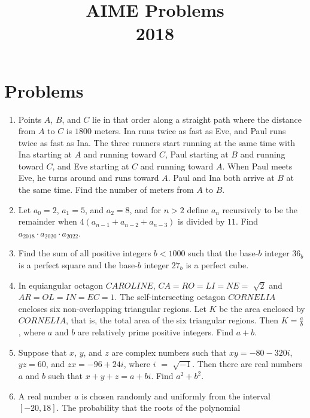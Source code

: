 \documentclass{article}
\title{AIME Problems \\ 2018}
\date{}
\begin{document}
\maketitle\thispagestyle{fancy}\newpage\section*{Problems}\begin{enumerate}[label=\arabic*., itemsep=0.5em]\item Points $A$, $B$, and $C$ lie in that order along a straight path where the distance from $A$ to $C$ is $1800$ meters. Ina runs twice as fast as Eve, and Paul runs twice as fast as Ina. The three runners start running at the same time with Ina starting at $A$ and running toward $C$, Paul starting at $B$ and running toward $C$, and Eve starting at $C$ and running toward $A$. When Paul meets Eve, he turns around and runs toward $A$. Paul and Ina both arrive at $B$ at the same time. Find the number of meters from $A$ to $B$.\par \vspace{0.5em}\item Let $a_{0} = 2$, $a_{1} = 5$, and $a_{2} = 8$, and for $n > 2$ define $a_{n}$ recursively to be the remainder when $4(a_{n-1} + a_{n-2} + a_{n-3})$ is divided by $11$. Find $a_{2018} \cdot a_{2020} \cdot a_{2022}$.\par \vspace{0.5em}\item Find the sum of all positive integers $b < 1000$ such that the base-$b$ integer $36_{b}$ is a perfect square and the base-$b$ integer $27_{b}$ is a perfect cube.\par \vspace{0.5em}\item In equiangular octagon $CAROLINE$, $CA = RO = LI = NE =$ $\sqrt{2}$ and $AR = OL = IN = EC = 1$. The self-intersecting octagon $CORNELIA$ encloses six non-overlapping triangular regions. Let $K$ be the area enclosed by $CORNELIA$, that is, the total area of the six triangular regions. Then $K = \frac{a}{b}$, where $a$ and $b$ are relatively prime positive integers. Find $a + b$.\par \vspace{0.5em}\item Suppose that $x$, $y$, and $z$ are complex numbers such that $xy = -80 - 320i$, $yz = 60$, and $zx = -96 + 24i$, where $i$ $=$ $\sqrt{-1}$. Then there are real numbers $a$ and $b$ such that $x + y + z = a + bi$. Find $a^2 + b^2$.\par \vspace{0.5em}\item A real number $a$ is chosen randomly and uniformly from the interval $[-20, 18]$. The probability that the roots of the polynomial



\end{enumerate}
\end{document}
